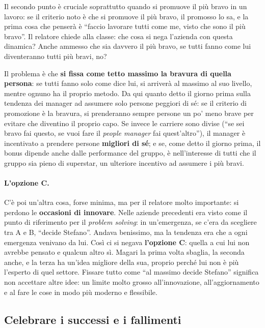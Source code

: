 Il secondo punto è cruciale soprattutto quando si promuove il più bravo in un lavoro: se il criterio
noto è che si promuove il più bravo, il promosso lo sa, e la prima cosa che penserà è ``faccio lavorare
tutti come me, visto che sono il più bravo''. Il relatore chiede alla classe: che cosa si nega l'azienda
con questa dinamica? Anche ammesso che sia davvero il più bravo, se tutti fanno come lui diventeranno
tutti più bravi, no?

Il problema è che \textbf{si fissa come tetto massimo la bravura di quella persona}: se tutti fanno solo
come dice lui, si arriverà al massimo al suo livello, mentre ognuno ha il proprio metodo. Da qui quanto
detto il giorno prima sulla tendenza dei manager ad assumere solo persone peggiori di sé: se il criterio
di promozione è la bravura, si prenderanno sempre persone un po' meno brave per evitare che diventino il
proprio capo. Se invece le carriere sono divise (``se sei bravo fai questo, se vuoi fare il \emph{people
manager} fai quest'altro''), il manager è incentivato a prendere persone \textbf{migliori di sé}; e se,
come detto il giorno prima, il bonus dipende anche dalle performance del gruppo, è nell'interesse di
tutti che il gruppo sia pieno di superstar, un ulteriore incentivo ad assumere i più bravi.

\paragraph{L'opzione C.} C'è poi un'altra cosa, forse minima, ma per il relatore molto importante: si
perdono le \textbf{occasioni di innovare}. Nelle aziende precedenti era visto come il punto di riferimento
per il \emph{problem solving}: in un'emergenza, se c'era da scegliere tra A e B, ``decide Stefano''. Andava
benissimo, ma la tendenza era che a ogni emergenza venivano da lui. Così ci si negava \textbf{l'opzione C}:
quella a cui lui non avrebbe pensato e qualcun altro sì. Magari la prima volta sbaglia, la seconda anche,
e la terza ha un'idea migliore della sua, proprio perché lui non è più l'esperto di quel settore. Fissare
tutto come ``al massimo decide Stefano'' significa non accettare altre idee: un limite molto grosso
all'innovazione, all'aggiornamento e al fare le cose in modo più moderno e flessibile.

\subsection{Celebrare i successi e i fallimenti}

